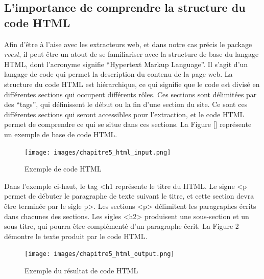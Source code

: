 \documentclass[
  letterpaper,
  DIV=11,
  numbers=noendperiod]{scrreprt}
\begin{document}
\hypertarget{limportance-de-comprendre-la-structure-du-code-html}{%
\subsection{L'importance de comprendre la structure du code
HTML}\label{limportance-de-comprendre-la-structure-du-code-html}}

Afin d'être à l'aise avec les extracteurs web, et dans notre cas précis
le package \emph{rvest}, il peut être un atout de se familiariser avec
la structure de base du langage HTML, dont l'acronyme signifie
``Hypertext Markup Language''. Il s'agit d'un langage de code qui permet
la description du contenu de la page web. La structure du code HTML est
hiérarchique, ce qui signifie que le code est divisé en différentes
sections qui occupent différents rôles. Ces sections sont délimitées par
des ``tags'', qui définissent le début ou la fin d'une section du site.
Ce sont ces différentes sections qui seront accessibles pour
l'extraction, et le code HTML permet de comprendre ce qui se situe dans
ces sections. La Figure {[}{]} représente un exemple de base de code
HTML.

\begin{figure}

{\centering \texttt{[image: images/chapitre5\_html\_input.png]}

}

\caption{Exemple de code HTML}

\end{figure}

Dans l'exemple ci-haut, le tag \textless h1 représente le titre du HTML.
Le signe \textless p permet de débuter le paragraphe de texte suivant le
titre, et cette section devra être terminée par le sigle p\textgreater.
Les sections \textless p\textgreater{} délimitent les paragraphes écrits
dans chacunes des sections. Les sigles \textless h2\textgreater{}
produisent une sous-section et un sous titre, qui pourra être
complémenté d'un paragraphe écrit. La Figure 2 démontre le texte produit
par le code HTML.

\begin{figure}

{\centering \texttt{[image: images/chapitre5\_html\_output.png]}

}

\caption{Exemple du résultat de code HTML}

\end{figure}
\end{document}
